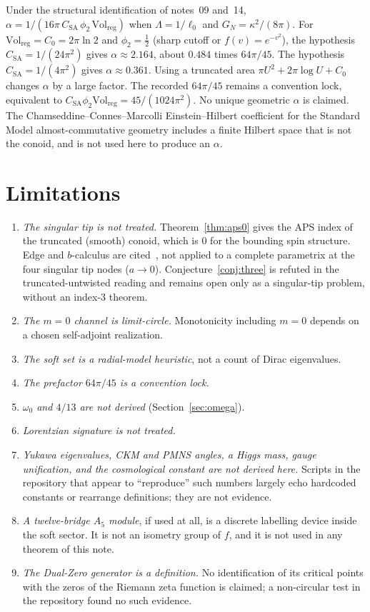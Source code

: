 \documentclass[11pt,a4paper]{article}
\theoremstyle{definition}
\theoremstyle{remark}
\begin{document}
Under the structural identification of notes~09 and~14,
$\alpha=1/(16\pi\,C_{\mathrm{SA}}\,\phi_2\,\mathrm{Vol}_{\mathrm{reg}})$
when $\Lambda=1/\ell_0$ and $G_N=\kappa^2/(8\pi)$. For
$\mathrm{Vol}_{\mathrm{reg}}=C_0=2\pi\ln 2$ and $\phi_2=\tfrac12$
(sharp cutoff or $f(v)=e^{-v^2}$), the hypothesis
$C_{\mathrm{SA}}=1/(24\pi^2)$ gives $\alpha\approx 2.164$, about $0.484$
times $64\pi/45$. The hypothesis $C_{\mathrm{SA}}=1/(4\pi^2)$ gives
$\alpha\approx 0.361$. Using a truncated area $\pi U^2+2\pi\log U+C_0$
changes $\alpha$ by a large factor. The recorded $64\pi/45$ remains a
convention lock, equivalent to
$C_{\mathrm{SA}}\phi_2\mathrm{Vol}_{\mathrm{reg}}=45/(1024\pi^2)$.
No unique geometric $\alpha$ is claimed. The Chamseddine--Connes--Marcolli
Einstein--Hilbert coefficient for the Standard Model almost-commutative
geometry includes a finite Hilbert space that is not the conoid, and is
not used here to produce an $\alpha$.

\section{Limitations}

\begin{enumerate}
\item \emph{The singular tip is not treated.}
  Theorem~\ref{thm:aps0} gives the APS index of the truncated
  (smooth) conoid, which is $0$ for the bounding spin structure.
  Edge and $b$-calculus are cited~\cite{APS1975,MelroseAPS}, not applied
  to a complete parametrix at the four singular tip nodes ($a\to 0$).
  Conjecture~\ref{conj:three} is refuted in the truncated-untwisted
  reading and remains open only as a singular-tip problem, without
  an index-$3$ theorem.
\item \emph{The $m=0$ channel is limit-circle.} Monotonicity including
  $m=0$ depends on a chosen self-adjoint realization.
\item \emph{The soft set is a radial-model heuristic}, not a count of
  Dirac eigenvalues.
\item \emph{The prefactor $64\pi/45$ is a convention lock.}
\item \emph{$\omega_0$ and $4/13$ are not derived}
  (Section~\ref{sec:omega}).
\item \emph{Lorentzian signature is not treated.}
\item \emph{Yukawa eigenvalues, CKM and PMNS angles, a Higgs mass, gauge
  unification, and the cosmological constant are not derived here.}
  Scripts in the repository that appear to ``reproduce'' such numbers
  largely echo hardcoded constants or rearrange definitions; they are
  not evidence.
\item \emph{A twelve-bridge $A_5$ module}, if used at all, is a discrete
  labelling device inside the soft sector. It is not an isometry group
  of $f$, and it is not used in any theorem of this note.
\item \emph{The Dual-Zero generator is a definition.} No identification
  of its critical points with the zeros of the Riemann zeta function is
  claimed; a non-circular test in the repository found no such evidence.
\end{enumerate}
\end{document}

